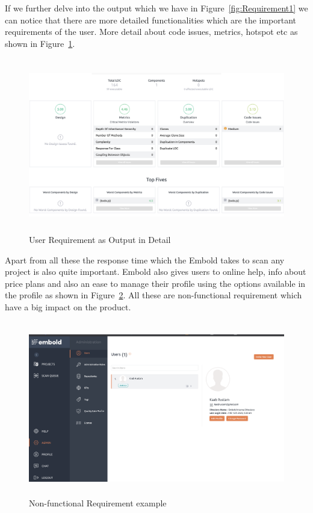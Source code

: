 If we further delve into the output which we have in Figure~\ref{fig:Requirement1} we can notice that there are more detailed functionalities which are the important requirements of the user. More detail about code issues, metrics, hotspot etc as shown in Figure~\ref{fig:Requirement2}.\par
\begin{figure}[htbp]
\begin{center}
\includegraphics[width=6.5 in, height=3in]{requirement2.png}
\caption{User Requirement as Output in Detail}
\label{fig:Requirement2}
\end{center}
\end{figure}
Apart from all these the response time which the Embold takes to scan any project is also quite important. Embold also gives users to online help, info about price plans and also an ease to manage their profile using the options available in the profile as shown in Figure~\ref{fig:Requirement3}. All these are non-functional requirement which have a big impact on the product. 
\begin{figure}[htbp]
\begin{center}
\includegraphics[width=6.5 in, height=3in]{Requirement3.png}
\caption{Non-functional Requirement example} 
\label{fig:Requirement3}
\end{center}
\end{figure}

